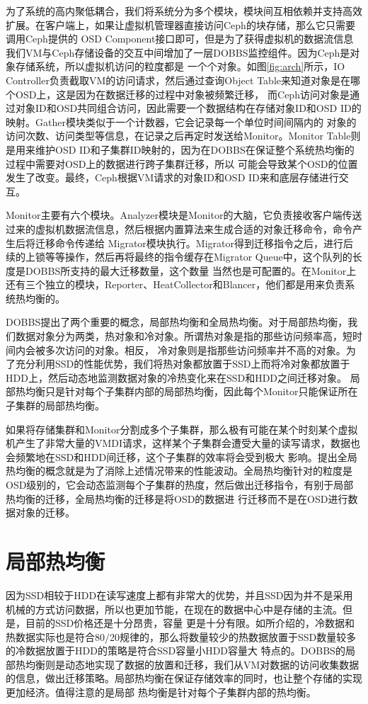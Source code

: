 为了系统的高内聚低耦合，我们将系统分为多个模块，模块间互相依赖并支持高效扩展。在客户端上，如果让虚拟机管理器直接访问Ceph的块存储，那么它只需要调用Ceph提供的
OSD Component接口即可，但是为了获得虚拟机的数据流信息我们VM与Ceph存储设备的交互中间增加了一层DOBBS监控组件。因为Ceph是对象存储系统，所以虚拟机访问的粒度都是
一个个对象。如图\ref{fig:arch}所示，IO Controller负责截取VM的访问请求，然后通过查询Object Table来知道对象是在哪个OSD上，这是因为在数据迁移的过程中对象被频繁迁移，
而Ceph访问对象是通过对象ID和OSD共同组合访问，因此需要一个数据结构在存储对象ID和OSD ID的映射。Gather模块类似于一个计数器，它会记录每一个单位时间间隔内的
对象的访问次数、访问类型等信息，在记录之后再定时发送给Monitor。Monitor Table则是用来维护OSD ID和子集群ID映射的，因为在DOBBS在保证整个系统热均衡的过程中需要对OSD上的数据进行跨子集群迁移，所以
可能会导致某个OSD的位置发生了改变。最终，Ceph根据VM请求的对象ID和OSD ID来和底层存储进行交互。

Monitor主要有六个模块。Analyzer模块是Monitor的大脑，它负责接收客户端传送过来的虚拟机数据流信息，然后根据内置算法来生成合适的对象迁移命令，命令产生后将迁移命令传递给
Migrator模块执行。Migrator得到迁移指令之后，进行后续的上锁等等操作，然后再将最终的指令缓存在Migrator Queue中，这个队列的长度是DOBBS所支持的最大迁移数量，这个数量
当然也是可配置的。在Monitor上还有三个独立的模块，Reporter、HeatCollector和Blancer，他们都是用来负责系统热均衡的。

DOBBS提出了两个重要的概念，局部热均衡和全局热均衡。对于局部热均衡，我们数据对象分为两类，热对象和冷对象。所谓热对象是指的那些访问频率高，短时间内会被多次访问的对象。相反，
冷对象则是指那些访问频率并不高的对象。为了充分利用SSD的性能优势，我们将热对象都放置于SSD上而将冷对象都放置于HDD上，然后动态地监测数据对象的冷热变化来在SSD和HDD之间迁移对象。
局部热均衡只是针对每个子集群内部的局部热均衡，因此每个Monitor只能保证所在子集群的局部热均衡。

如果将存储集群和Monitor分割成多个子集群，那么极有可能在某个时刻某个虚拟机产生了非常大量的VMDI请求，这样某个子集群会遭受大量的读写请求，数据也会频繁地在SSD和HDD间迁移，这个子集群的效率将会受到极大
影响。提出全局热均衡的概念就是为了消除上述情况带来的性能波动。全局热均衡针对的粒度是OSD级别的，它会动态监测每个子集群的热度，然后做出迁移指令，有别于局部热均衡的迁移，全局热均衡的迁移是将OSD的数据进
行迁移而不是在OSD进行数据对象的迁移。

\section{局部热均衡}
因为SSD相较于HDD在读写速度上都有非常大的优势，并且SSD因为并不是采用机械的方式访问数据，所以也更加节能，在现在的数据中心中是存储的主流。但是，目前的SSD价格还是十分昂贵，容量
更是十分有限。如所介绍的，冷数据和热数据实际也是符合80/20规律的，那么将数量较少的热数据放置于SSD数量较多的冷数据放置于HDD的策略是符合SSD容量小HDD容量大
特点的。DOBBS的局部热均衡则是动态地实现了数据的放置和迁移，我们从VM对数据的访问收集数据的信息，做出迁移策略。局部热均衡在保证存储效率的同时，也让整个存储的实现更加经济。值得注意的是局部
热均衡是针对每个子集群内部的热均衡。

